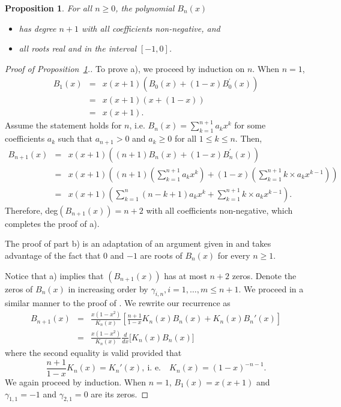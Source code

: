 \documentclass[10pt]{amsart}
\newtheorem{proposition}[theorem]{Proposition}
\numberwithin{subcase}{case}
\begin{document}
\begin{proposition}\label{prop:roots}
For all $n\geq0$, the polynomial $B_{n}(x)$
\begin{itemize}
\item[a)]{} has degree $n+1$ with all coefficients non-negative, and
\item[b)]{} all roots real and in the interval $[-1,0]$.
\end{itemize}
\end{proposition}
\begin{proof}[Proof of Proposition~\ref{prop:roots}.]
To prove a), we proceed by induction on $n$. When $n=1$, 
\begin{eqnarray*}
B_1(x)&=&x(x+1)\left(B_0(x)+(1-x)B_0^{'}(x)\right)\\
&=&x(x+1)\left(x+(1-x)\right)\\
&=&x(x+1).
\end{eqnarray*}
Assume the statement holds for $n$, i.e. $B_n(x)=\sum_{k=1}^{n+1}a_kx^k$ for some coefficients $a_k$ such that $a_{n+1}>0$ and $a_k\geq0$ for all $1\leq k\leq n$. Then,
\begin{eqnarray*}
B_{n+1}(x)&=&x(x+1)\left((n+1)B_n(x)+(1-x)B_n^{'}(x)\right)\\
&=&x(x+1)\left((n+1)\left(\sum_{k=1}^{n+1}a_kx^k\right)+(1-x)\left(\sum_{k=1}^{n+1}k\times a_kx^{k-1}\right)\right)\\
&=&x(x+1)\left(\sum_{k=1}^{n}(n-k+1)a_kx^k+\sum_{k=1}^{n+1}k\times a_kx^{k-1}\right).
\end{eqnarray*}
Therefore, deg$\left(B_{n+1}(x)\right)=n+2$ with all coefficients non-negative, which completes the proof of a).
 
The proof of part b) is an adaptation of an argument given in \cite{DDJ} and takes advantage of the fact that $0$ and $-1$ are roots of $B_n(x)$ for every $n\ge 1$. 

Notice that a) implies that $\left(B_{n+1}(x)\right)$ has at most $n+2$ zeros. Denote the zeros of $B_n(x)$ in increasing order by $\gamma_{i,n}, i=1,\dots,m\leq n+1$. We proceed in a similar manner to the proof of \cite[Theorem 5]{DDJ}. 
We  rewrite our recurrence as
\begin{eqnarray*}
B_{n+1}(x)&=&\frac{x(1-x^2)}{K_n(x)}\left[\frac{n+1}{1-x}K_{n}(x)B_n(x)+K_n(x)B_n'(x)\right]\\&=&
\frac{x(1-x^2)}{K_n(x)}
\frac{d}{dx}\Big[K_{n}(x)B_{n}(x)\Big]
\end{eqnarray*}
where the second equality  is valid provided that  
\[\frac{n+1}{1-x}K_n(x)=K_n'(x),\ \mbox{i. e.}\quad 
K_{n}(x)=(1-x)^{-n-1}.\]
We again proceed by induction. 
When $n=1$, $B_1(x)=x(x+1)$
and 
$\gamma_{1,1}=-1$ and $\gamma_{2,1}=0$ are its zeros. 


\end{proof}
\end{document}
